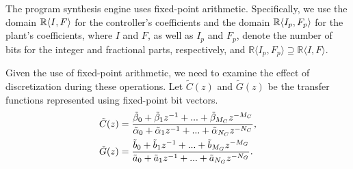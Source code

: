 \documentclass[final]{sig-alternate-05-2015}
\begin{document}
The program synthesis engine uses fixed-point arithmetic.  Specifically, we
use the domain $\mathbb{R}\langle{I},{F}\rangle$ for the controller's coefficients
and the domain $\mathbb{R}\langle{I_p},{F_p}\rangle$ for the plant's coefficients,
where $I$ and $F$, as well as $I_p$ and $F_p$, denote the number of bits for
the integer and fractional parts, respectively, and $\mathbb{R}\langle
I_p,F_p \rangle \supseteq \mathbb{R}\langle I,F \rangle$.
%

Given the use of fixed-point arithmetic, 
we need to examine the effect of discretization during these operations.
Let $\tilde C(z)$ and $\tilde G(z)$ be the transfer functions represented
using fixed-point bit vectors.%
%
\begin{align}
\small
\label{digital_controller_plant_tf}
\tilde C(z)&=\frac{\tilde \beta_{0}+\tilde \beta_{1}z^{-1}+...+\tilde \beta_{M_C}z^{-M_C}}{\tilde \alpha_{0}+\tilde \alpha_{1}z^{-1}+...+\tilde \alpha_{N_C}z^{-N_C}}, \\
\tilde G(z)&=\frac{\tilde b_{0}+\tilde b_{1}z^{-1}+...+\tilde b_{M_G}z^{-M_G}}{\tilde a_{0}+\tilde a_{1}z^{-1}+...+\tilde a_{N_G}z^{-N_G}}.
\end{align}
 
\end{document}
